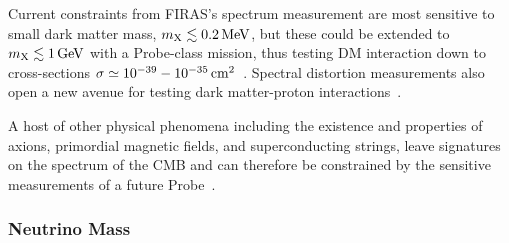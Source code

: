 Current constraints from FIRAS's spectrum measurement are most sensitive to small dark matter
mass, $m_{\rm X}\lesssim 0.2\,{\rm MeV}$, but these could be extended to $m_{\rm X}\lesssim 1\,{\rm GeV}$ with a 
Probe-class mission, thus testing DM interaction down to cross-sections 
$\sigma\simeq 10^{-39}-10^{-35}\,{\rm cm}^2$~\cite{Yacine2015DM}. 
Spectral distortion measurements also open a new avenue for testing dark matter-proton interactions~\cite{Yacine2015DM}.

A host of other physical phenomena including the existence and properties of axions, primordial magnetic fields, and 
superconducting strings, leave signatures on the spectrum of the CMB and can therefore be constrained by 
the sensitive measurements  of a future Probe~\cite[e.g.,][]{Jedamzik2000, Tashiro2012, Dolgov2013, Tashiro2013, Caldwell2013}.

\vspace{-0.18in}

\subsubsection{Neutrino Mass}

\vspace{-0.05in}

